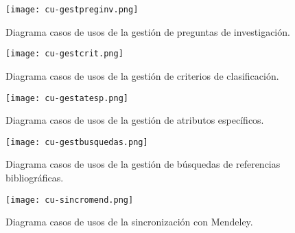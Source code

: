 \begin{figure}[!hpt]
	\begin{center}
		\texttt{[image: cu-gestpreginv.png]}
		\caption{Diagrama casos de usos de la gestión de preguntas de investigación.}
		\label{fig:cu04}
	\end{center}
\end{figure}

\begin{figure}[!hpt]
	\begin{center}
		\texttt{[image: cu-gestcrit.png]}
		\caption{Diagrama casos de usos de la gestión de criterios de clasificación.}
		\label{fig:cu05}
	\end{center}
\end{figure}

\begin{figure}[!hpt]
	\begin{center}
		\texttt{[image: cu-gestatesp.png]}
		\caption{Diagrama casos de usos de la gestión de atributos específicos.}
		\label{fig:cu06}
	\end{center}
\end{figure}

\begin{figure}[!hpt]
	\begin{center}
		\texttt{[image: cu-gestbusquedas.png]}
		\caption{Diagrama casos de usos de la gestión de búsquedas de referencias bibliográficas.}
		\label{fig:cu07}
	\end{center}
\end{figure}

\newpage

\begin{figure}[!hpt]
	\begin{center}
		\texttt{[image: cu-sincromend.png]}
		\caption{Diagrama casos de usos de la sincronización con Mendeley.}
		\label{fig:cu08}
	\end{center}
\end{figure}


